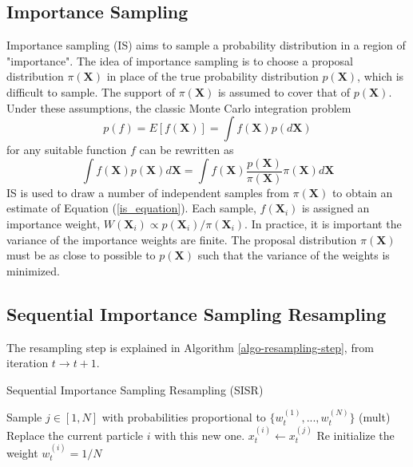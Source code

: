 \documentclass[11pt,a4,twosided,singlespacing,titlepagenumber=on]{scrreprt}
\numberwithin{equation}{chapter} %
\theoremstyle{remark}
\newcommand{\matr}[1]{\mathbf{#1}}
\begin{document}
\subsection{Importance Sampling}
Importance sampling (IS) aims to sample a probability distribution in a region of "importance". The idea of importance sampling is to choose a proposal distribution $\pi(\matr{X})$ in place of the true probability distribution $p(\matr{X})$, which is difficult to sample. The support of $\pi(\matr{X})$ is assumed to cover that of $p(\matr{X})$. Under these assumptions, the classic Monte Carlo integration problem
\begin{equation}
p(f) = E[f(\matr{X})] = \int f(\matr{X})p(d\matr{X})
\end{equation}
for any suitable function $f$ can be rewritten as
\begin{equation}
\int f(\matr{X})p(\matr{X})d\matr{X} = \int f(\matr{X}) \frac{p(\matr{X})}{\pi(\matr{X})} \pi(\matr{X}) d\matr{X} \label{is_equation}
\end{equation}
IS is used to draw a number of independent samples from $\pi(\matr{X})$ to obtain an estimate of Equation (\ref{is_equation}). Each sample, $f(\matr{X}_i)$ is assigned an importance weight, $W(\matr{X}_i) \propto p(\matr{X}_i)/\pi(\matr{X}_i)$. In practice, it is important the variance of the importance weights are finite. The proposal distribution $\pi(\matr{X})$ must be as close to possible to $p(\matr{X})$ such that the variance of the weights is minimized. 

\subsection{Sequential Importance Sampling Resampling}
The resampling step is explained in Algorithm \ref{algo-resampling-step}, from iteration $t \rightarrow t+1$.
\begin{algorithm}[H]
\caption{Sequential Importance Sampling Resampling (SISR)}\label{sisr_filter}
\begin{algorithmic}[1]
  \State Sample $j \in [1,N]$ with probabilities proportional to $\{w_{t}^{(1)},..., w_{t}^{(N)}\}$ (mult)
  \State Replace the current particle $i$ with this new one. $x_t^{(i)} \gets x_t^{(j)}$
  \State Re initialize the weight $w_t^{(i)} = 1/N$
\label{algo-resampling-step}
\end{algorithmic}
\end{algorithm}
\end{document}
